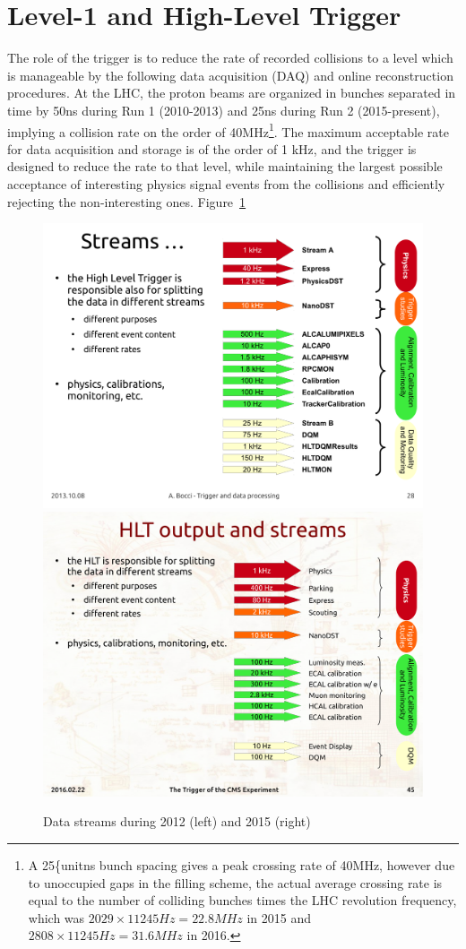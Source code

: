 \section {Level-1 and High-Level Trigger}
\label{sec:trigger}

The role of the trigger is to reduce the rate of recorded collisions to
a level which is manageable by the following data acquisition (DAQ)
and online reconstruction procedures. At the LHC, the proton beams are organized in
bunches separated in time by 50\unit{ns} during Run 1 (2010-2013) and 25\unit{ns}
during Run 2 (2015-present), implying a collision rate on the order of
40\unit{MHz}\footnote{A 25\{unit{ns} bunch spacing gives a peak
  crossing rate of 40\unit{MHz}, however due to unoccupied gaps in the filling
  scheme, the actual average crossing rate is equal to the number of
  colliding bunches times the LHC revolution frequency, which was
  $2029\times 11245\unit{Hz} = 22.8\unit{MHz}$ in 2015 and $2808 \times 11245\unit{Hz} = 31.6
  \unit{MHz}$ in 2016.}.
The maximum acceptable rate for data acquisition and storage is of the order of 1 \unit{kHz}, and
the trigger is designed to reduce the rate to that level, while
maintaining the largest possible acceptance of interesting physics signal
events from the collisions and efficiently rejecting the
non-interesting ones. Figure~\ref{fig:streams}

\begin{figure}\centering
\includegraphics[width=.45\textwidth]{figs/cms/Streams2012.pdf}
\includegraphics[width=.45\textwidth]{figs/cms/Streams2015.pdf}
\caption{Data streams during 2012 (left) and 2015 (right)
\label{fig:streams}}
\end{figure}

